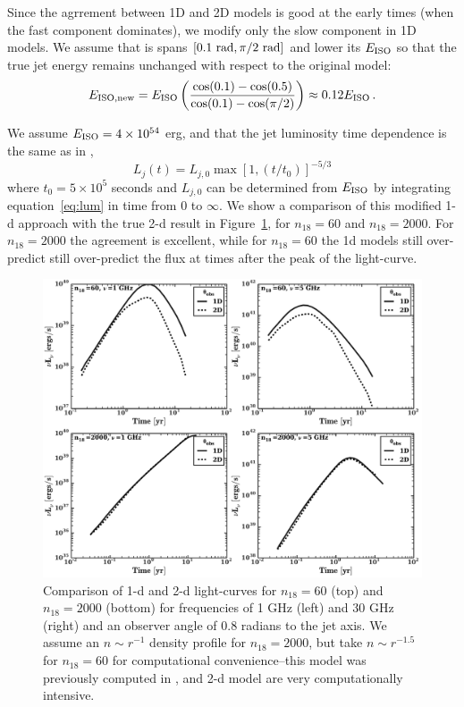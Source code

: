 \documentclass[usenatbib,fleqn]{mnras}
\begin{document}
Since the agrrement between 1D and 2D models is good at the early
times (when the fast component dominates), we modify only the slow
component in 1D models. We assume that is spans $[0.1\ {\rm rad},
\pi/2\ {\rm rad}]$ and lower its $E_{\rm ISO}$ so that the true jet
energy remains unchanged with respect to the original model:
\begin{equation}\label{eq:Eiso}
 E_{\rm ISO, new} = E_{\rm ISO} \left(\frac{\cos(0.1) - \cos(0.5)}{\cos(0.1) - \cos(\pi/2)}\right)\approx 0.12 E_{\rm ISO}\, .
\end{equation}

We assume $E_{\rm ISO} = 4\times 10^{54}$ erg, and that the jet luminosity time dependence is the same as in \citet{Mimica+2015},
\begin{equation}\label{eq:lum}
L_j(t) = L_{j,0}\max\left[1, (t/t_0)\right]^{-5/3}
\end{equation}
where $t_0 = 5\times 10^5$ seconds and $L_{j, 0}$ can be determined
from $E_{\rm ISO}$ by integrating equation~\ref{eq:lum} in time from
$0$ to $\infty$. We show a comparison of this modified 1-d approach
with the true 2-d result in Figure~\ref{fig:1d2dB}, for $n_{18}=60$
and $n_{18}=2000$. For $n_{18}=2000$ the agreement is excellent, while
for $n_{18}=60$ the 1d models still over-predict still over-predict
the flux at times after the peak of the light-curve.




\begin{figure}
\includegraphics[width=16cm]{1d_2d.pdf}
\caption{\label{fig:1d2dB} Comparison of 1-d and 2-d light-curves for
  $n_{18}=60$ (top) and $n_{18}=2000$ (bottom) for frequencies of 1
  GHz (left) and 30 GHz (right) and an observer angle of 0.8 radians
  to the jet axis. We assume an $n\sim r^{-1}$ density profile for
  $n_{18}=2000$, but take $n\sim r^{-1.5}$ for $n_{18}=60$ for
  computational convenience--this model was previously computed in
  \citet{Mimica+2015}, and 2-d model are very computationally intensive.}
\end{figure}
\end{document}
